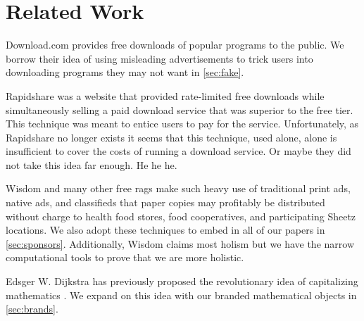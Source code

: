 \section{Related Work}
\label{sec:related}

Download.com \cite{download-com} provides free downloads of popular programs to
the public.
We borrow their idea of using misleading advertisements to trick users into
downloading programs they may not want in \autoref{sec:fake}.

Rapidshare \cite{rapidshare} was a website that provided rate-limited free
downloads while simultaneously selling a paid download service that was
superior to the free tier.
This technique was meant to entice users to pay for the service.
Unfortunately, as Rapidshare no longer exists it seems that this technique, used alone,
alone is insufficient to cover the costs of running a download service. Or maybe they did not take this idea far enough. He he he.

Wisdom \cite{wisdom} and many other free rags make such heavy use of traditional print ads,
native ads, and classifieds that paper copies may profitably be distributed without charge to health food stores, food cooperatives, and participating Sheetz locations.
We also adopt these techniques to embed in all of our papers in
\autoref{sec:sponsors}.
Additionally, Wisdom claims most holism but we have the narrow computational
tools to prove that we are more holistic.

Edsger W. Dijkstra has previously proposed the revolutionary idea of
capitalizing mathematics \cite{cap-math}.
We expand on this idea with our branded mathematical objects in
\autoref{sec:brands}.
